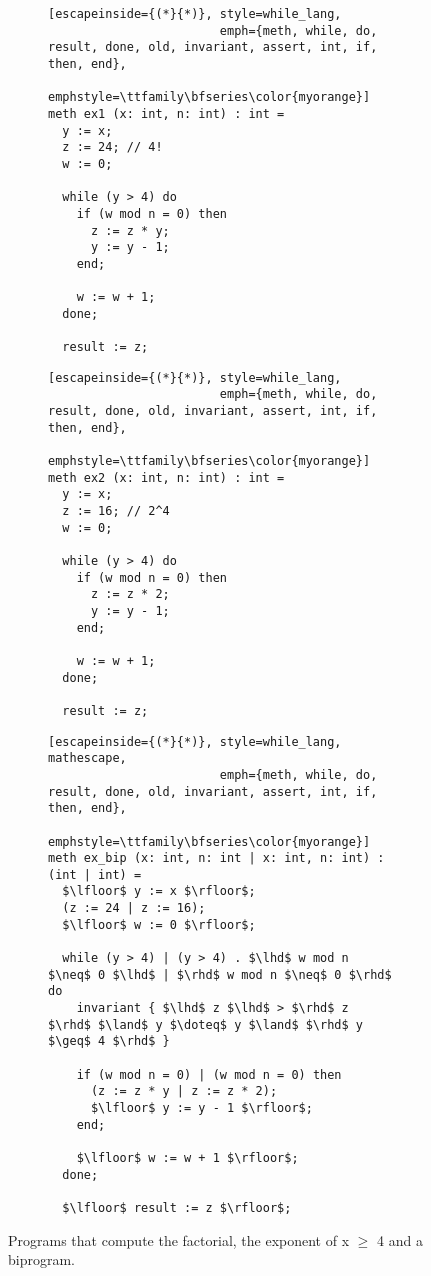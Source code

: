 \begin{figure}[h]
  \centering

  \begin{subfigure}[t]{0.49\textwidth}
    \centering
    \noindent
    \begin{lstlisting}[escapeinside={(*}{*)}, style=while_lang,
                        emph={meth, while, do, result, done, old, invariant, assert, int, if, then, end},
                        emphstyle=\ttfamily\bfseries\color{myorange}]
meth ex1 (x: int, n: int) : int =
  y := x;
  z := 24; // 4!
  w := 0;

  while (y > 4) do
    if (w mod n = 0) then
      z := z * y;
      y := y - 1;
    end;

    w := w + 1;
  done;

  result := z;
    \end{lstlisting}
  \end{subfigure}
  \hfill
  \begin{subfigure}[t]{0.49\textwidth}
    \centering
    \noindent
    \begin{lstlisting}[escapeinside={(*}{*)}, style=while_lang,
                        emph={meth, while, do, result, done, old, invariant, assert, int, if, then, end},
                        emphstyle=\ttfamily\bfseries\color{myorange}]
meth ex2 (x: int, n: int) : int =
  y := x;
  z := 16; // 2^4
  w := 0;

  while (y > 4) do
    if (w mod n = 0) then
      z := z * 2;
      y := y - 1;
    end;

    w := w + 1;
  done;

  result := z;
    \end{lstlisting}
  \end{subfigure}
  \hfill
  \begin{subfigure}[t]{0.99\textwidth}
    \centering
    \noindent
    \begin{lstlisting}[escapeinside={(*}{*)}, style=while_lang, mathescape,
                        emph={meth, while, do, result, done, old, invariant, assert, int, if, then, end},
                        emphstyle=\ttfamily\bfseries\color{myorange}]
meth ex_bip (x: int, n: int | x: int, n: int) : (int | int) =
  $\lfloor$ y := x $\rfloor$;
  (z := 24 | z := 16);
  $\lfloor$ w := 0 $\rfloor$;

  while (y > 4) | (y > 4) . $\lhd$ w mod n $\neq$ 0 $\lhd$ | $\rhd$ w mod n $\neq$ 0 $\rhd$ do
    invariant { $\lhd$ z $\lhd$ > $\rhd$ z $\rhd$ $\land$ y $\doteq$ y $\land$ $\rhd$ y $\geq$ 4 $\rhd$ }

    if (w mod n = 0) | (w mod n = 0) then
      (z := z * y | z := z * 2);
      $\lfloor$ y := y - 1 $\rfloor$;
    end;

    $\lfloor$ w := w + 1 $\rfloor$;
  done;

  $\lfloor$ result := z $\rfloor$;
    \end{lstlisting}
  \end{subfigure}

  \caption{Programs that compute the factorial, the exponent of x $\geq$ 4 and a biprogram.}
  \label{fig:cond_align_loops_ex}
\end{figure}

